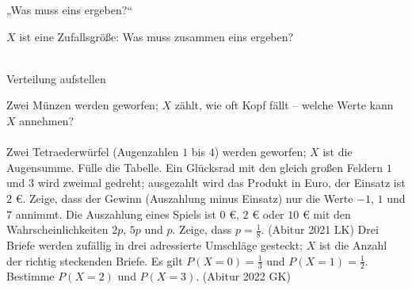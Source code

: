 \setcounter{aufgabe}{5}

\begin{aufgabe}{„Was muss eins ergeben?“}
\begin{teile}
\teil $X$ ist eine Zufallsgröße:  Was muss zusammen eins ergeben? \\ \\ 
\end{teile}
\end{aufgabe}

\begin{aufgabe}{Verteilung aufstellen}
\begin{teile}
\teil Zwei Münzen werden geworfen; $X$ zählt, wie oft Kopf fällt – welche Werte kann $X$ annehmen? \\ \\ 
\teil Zwei Tetraederwürfel (Augenzahlen $1$ bis $4$) werden geworfen; $X$ ist die Augensumme. Fülle die Tabelle. 
\teil Ein Glücksrad mit den gleich großen Feldern $1$ und $3$ wird zweimal gedreht; ausgezahlt wird das Produkt in Euro, der Einsatz ist $2$ €. Zeige, dass der Gewinn (Auszahlung minus Einsatz) nur die Werte $-1$, $1$ und $7$ annimmt.
\teil Die Auszahlung eines Spiels ist $0$ €, $2$ € oder $10$ € mit den Wahrscheinlichkeiten $2p$, $5p$ und $p$. Zeige, dass $p = \frac{1}{8}$. \hfill (Abitur 2021 LK)
\teil Drei Briefe werden zufällig in drei adressierte Umschläge gesteckt; $X$ ist die Anzahl der richtig steckenden Briefe. Es gilt $P(X = 0) = \frac{1}{3}$ und $P(X = 1) = \frac{1}{2}$. Bestimme $P(X = 2)$ und $P(X = 3)$. \hfill (Abitur 2022 GK)
\end{teile}
\end{aufgabe}

